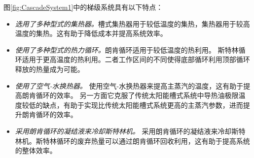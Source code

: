 图\ref{fig:CascadeSystem1}中的梯级系统具有以下特点：
\begin{itemize}
  \item \emph{选用了多种型式的集热器。}槽式集热器用于较低温度的集热，集热器用于较高温度的集热。这有助于降低成本并提高系统效率。
  \item \emph{使用了多种型式的热力循环。}朗肯循环适用于较低温度的热利用。 斯特林循环适用于更高温度的热利用。二者工作区间的不同使得底部循环利用顶部循环释放的热量成为可能。
  \item \emph{使用了空气-水换热器。} 使用空气-水换热器来提高主蒸汽的温度，这有助于提高朗肯循环的效率。 另一方面它克服了传统太阳能槽式系统中导热油极限温度较低的缺点，有助于实现比传统太阳能槽式系统更高的主蒸汽参数，进而提升朗肯循环的效率。 
  \item \emph{采用朗肯循环的凝结液来冷却斯特林机。} 采用朗肯循环的凝结液来冷却斯特林机。斯特林循环的废弃热量可以通过朗肯循环回收利用，这有助于提高系统的整体效率。
\end{itemize}


